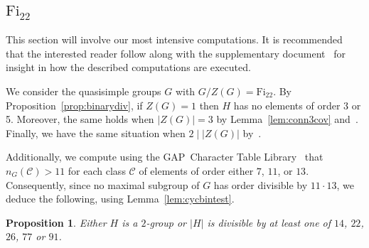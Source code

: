 \documentclass[11pt, a4paper]{amsart}
\newcommand{\gap}{{\sf GAP}}
\newtheorem{prop}[thm]{Proposition}
\begin{document}
\subsection{$\mathrm{Fi}_{22}$}
This section will involve our most intensive computations. It is recommended that the interested reader follow along with the supplementary document~\cite{comps} for insight in how the described computations are executed. 

We consider the quasisimple groups $G$ with $G/Z(G)=\mathrm{Fi}_{22}$. By Proposition~\ref{prop:binarydiv}, if  $Z(G)=1$ then $H$ has no elements of order 3 or 5. Moreover, the same holds when $|Z(G)|=3$ by Lemma~\ref{lem:conn3cov} and~\cite[Table 8]{CDP}. Finally, we have the same situation when $2\mid |Z(G)|$ by~\cite[Lemma 2.12]{CDP}.


Additionally, we compute using the \gap~Character Table Library~\cite{CTblLib1.3.11} that $n_G(\mathcal{C})>11$ for each class $\mathcal{C}$ of elements of order either $7$, $11$, or $13$. Consequently, since no maximal subgroup of $G$ has order divisible by $11\cdot 13$, we deduce the following, using Lemma~\ref{lem:cycbintest}.
\begin{prop}
    Either $H$ is a $2$-group or $|H|$ is divisible by at least one of $14$, $22$, $26$, $77$ or $91$.
\end{prop}
\end{document}
